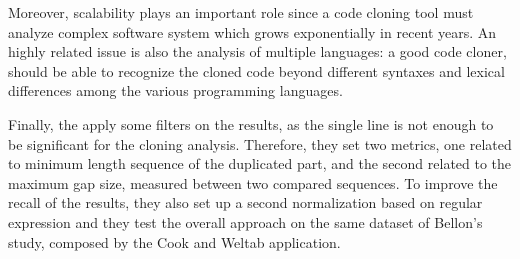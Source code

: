Moreover, scalability plays an important role since a code cloning tool must analyze complex software system which grows exponentially in recent years. An highly related issue is also the analysis of multiple languages: a good code cloner, should be able to recognize the cloned code beyond different syntaxes and lexical differences among the various programming languages. %


Finally, the apply some filters on the results, as the single line is not 
enough to be significant for the cloning analysis. Therefore, they set two 
metrics, one related to minimum length sequence of the duplicated part, and the 
second related to the maximum gap size, measured between two compared 
sequences. To improve the recall of the results, they also set up a second 
normalization based on regular expression and they test the overall approach on 
the same dataset of Bellon's study, composed by the Cook and Weltab 
application. 


